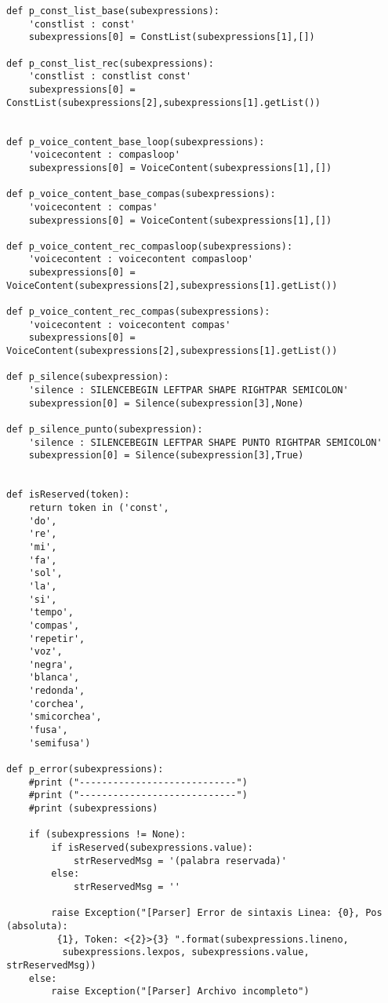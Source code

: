 \begin{verbatim}
def p_const_list_base(subexpressions):
    'constlist : const'
    subexpressions[0] = ConstList(subexpressions[1],[])

def p_const_list_rec(subexpressions):
    'constlist : constlist const'
    subexpressions[0] = ConstList(subexpressions[2],subexpressions[1].getList())


def p_voice_content_base_loop(subexpressions):
    'voicecontent : compasloop'
    subexpressions[0] = VoiceContent(subexpressions[1],[])

def p_voice_content_base_compas(subexpressions):
    'voicecontent : compas'
    subexpressions[0] = VoiceContent(subexpressions[1],[])

def p_voice_content_rec_compasloop(subexpressions):
    'voicecontent : voicecontent compasloop'
    subexpressions[0] = VoiceContent(subexpressions[2],subexpressions[1].getList())

def p_voice_content_rec_compas(subexpressions):
    'voicecontent : voicecontent compas'
    subexpressions[0] = VoiceContent(subexpressions[2],subexpressions[1].getList())

def p_silence(subexpression):
    'silence : SILENCEBEGIN LEFTPAR SHAPE RIGHTPAR SEMICOLON'
    subexpression[0] = Silence(subexpression[3],None)

def p_silence_punto(subexpression):
    'silence : SILENCEBEGIN LEFTPAR SHAPE PUNTO RIGHTPAR SEMICOLON'
    subexpression[0] = Silence(subexpression[3],True)


def isReserved(token):
    return token in ('const',
    'do',
    're',
    'mi',
    'fa',
    'sol',
    'la',
    'si',
    'tempo',
    'compas',
    'repetir',
    'voz',
    'negra',
    'blanca',
    'redonda',
    'corchea',
    'smicorchea',
    'fusa',
    'semifusa')

def p_error(subexpressions):
    #print ("----------------------------")
    #print ("----------------------------")
    #print (subexpressions)

    if (subexpressions != None):
        if isReserved(subexpressions.value):
            strReservedMsg = '(palabra reservada)'
        else:
            strReservedMsg = ''

        raise Exception("[Parser] Error de sintaxis Linea: {0}, Pos (absoluta):
         {1}, Token: <{2}>{3} ".format(subexpressions.lineno,
          subexpressions.lexpos, subexpressions.value, strReservedMsg))
    else:
        raise Exception("[Parser] Archivo incompleto")
\end{verbatim}